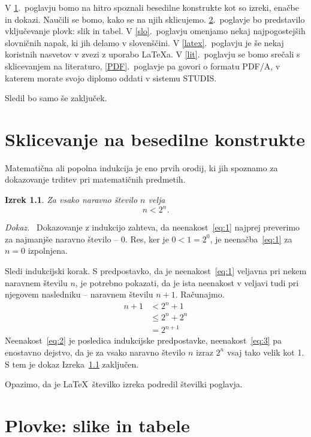 \documentclass[a4paper, 12pt]{book}
\newtheorem{izrek}{Izrek}[chapter]
\newenvironment{dokaz}{\emph{Dokaz.}\ }{\hspace{\fill}{$\Box$}}
\begin{document}
V \ref{ch1}.~poglavju bomo na hitro spoznali besedilne konstrukte kot so izreki, enačbe in dokazi. 
Naučili se bomo, kako se na njih sklicujemo. 
\ref{ch2}.~poglavje bo predstavilo vključevanje plovk: slik in tabel. 
V \ref{slo}.~poglavju omenjamo nekaj najpogostejših slovničnih napak, ki jih delamo v slovenščini.
V \ref{latex}.~poglavju je še nekaj koristnih nasvetov v zvezi z uporabo \LaTeX{a}.
V \ref{lit}.~poglavju se bomo srečali s sklicevanjem na literaturo,
\ref{PDF}.~poglavje pa govori o formatu PDF/A, v katerem morate svojo diplomo oddati v sistemu STUDIS.

Sledil bo samo še zaključek.


\chapter{Sklicevanje na besedilne konstrukte}
\label{ch1}

Matematična ali popolna indukcija je eno prvih orodij, ki jih spoznamo za dokazovanje trditev pri matematičnih predmetih.
\begin{izrek}
\label{iz:1}
Za vsako naravno število $n$ velja
\begin{equation}
n < 2^n.
\label{eq:1}
\end{equation}
\end{izrek}
\begin{dokaz}
Dokazovanje z indukcijo zahteva, da neenakost~\eqref{eq:1} najprej preverimo za najmanjše naravno število -- $0$. 
Res, ker je $0 < 1 = 2^0$, je neenačba~\eqref{eq:1} za $n=0$ izpolnjena.

Sledi indukcijski korak. S predpostavko, da je neenakost~\eqref{eq:1} veljavna pri nekem naravnem številu $n$, je potrebno pokazati, da je ista neenakost v veljavi tudi pri njegovem nasledniku -- naravnem številu $n+1$. 
Računajmo.
\begin{align}
n+1 & < 2^n + 1       \label{eq:2}\\
       & \le 2^n + 2^n \label{eq:3}\\
       & = 2^{n+1}       \nonumber
\end{align}
Neenakost~\eqref{eq:2} je posledica indukcijske predpostavke, neenakost~\eqref{eq:3} pa enostavno dejstvo, da je za vsako naravno število $n$ izraz $2^n$ vsaj tako velik kot 1. 
S tem je dokaz Izreka~\ref{iz:1} zaključen.
\end{dokaz}

Opazimo, da je \LaTeX\ številko izreka podredil številki poglavja.


\chapter{Plovke: slike in tabele}
\label{ch2}
\end{document}
